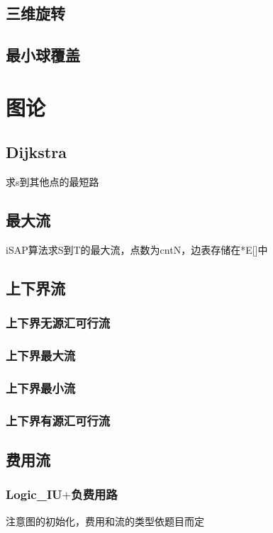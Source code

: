 \documentclass[a4paper,10pt]{book}
\begin{document}
	\section{三维旋转}
		
	\section{最小球覆盖}
		
		
\chapter{图论}
    \section{Dijkstra}
	    求s到其他点的最短路
	    

	\section{最大流}
	    iSAP算法求S到T的最大流，点数为cntN，边表存储在*E[]中
	    

	\section{上下界流}
	    
		\subsection{上下界无源汇可行流}
			
		\subsection{上下界最大流}
			
		\subsection{上下界最小流}
			
		\subsection{上下界有源汇可行流}
			

	\section{费用流}
		\subsection{Logic\_IU$+$负费用路}
			注意图的初始化，费用和流的类型依题目而定
			
\end{document}
